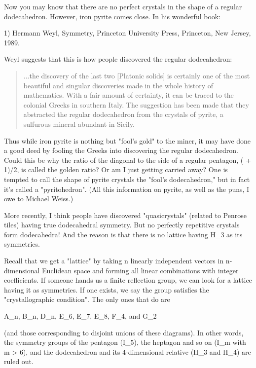 Now you may know that there are no perfect crystals in the shape of a
regular dodecahedron.  However, iron pyrite comes close.  In his wonderful
book:

1) Hermann Weyl, Symmetry, Princeton University Press, Princeton, New
Jersey, 1989.

Weyl suggests that this is how people discovered the regular dodecahedron:

\begin{quote}
    ...the discovery of the last two [Platonic solids] is certainly
    one of the most beautiful and singular discoveries made in the
    whole history of mathematics.  With a fair amount of certainty, it
    can be traced to the colonial Greeks in southern Italy.  The
    suggestion has been made that they abstracted the regular
    dodecahedron from the crystals of pyrite, a sulfurous mineral
    abundant in Sicily.
\end{quote}

Thus while iron pyrite is nothing but "fool's gold" to the miner, it
may have done a good deed by fooling the Greeks into discovering the
regular dodecahedron.  Could this be why the ratio of the diagonal
to the side of a regular pentagon, ( + 1)/2, is called the golden
ratio?  Or am I just getting carried away?  One is tempted to call the
shape of pyrite crystals the "fool's dodecahedron," but in fact it's
called a "pyritohedron".  (All this information on pyrite, as well as
the puns, I owe to Michael Weiss.)

More recently, I think people have discovered "quasicrystals" (related to
Penrose tiles) having true dodecahedral symmetry.  But no perfectly
repetitive crystals form dodecahedra!  And the reason is that there is no
lattice having H_{3} as its symmetries.

Recall that we get a "lattice" by taking n linearly independent vectors
in n-dimensional Euclidean space and forming all linear combinations
with integer coefficients.  If someone hands us a finite reflection group,
we can look for a lattice having it as symmetries.  If one exists, 
we say the group satisfies the "crystallographic condition".  The only
ones that do are

A_{n}, B_{n}, D_{n}, E_{6}, E_{7}, 
E_{8}, F_{4}, and G_{2}

(and those corresponding to disjoint unions of these diagrams).
In other words, the symmetry groups of the pentagon (I_{5}), the
heptagon and so on (I_{m} with m > 6), and the dodecahedron and its
4-dimensional relative (H_{3} and H_{4}) are ruled out.  

